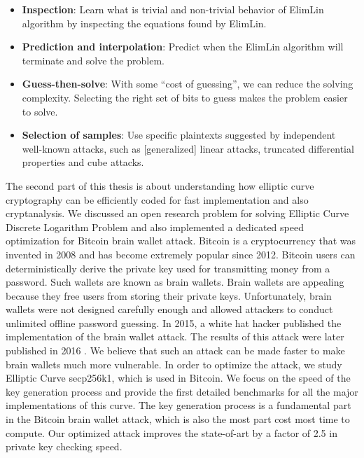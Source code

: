 \begin{itemize}
	\item \textbf{Inspection}: Learn what is trivial and non-trivial behavior of ElimLin algorithm by inspecting the equations found by ElimLin.
	\item \textbf{Prediction and interpolation}: Predict when the ElimLin algorithm will terminate and solve the problem.
	\item \textbf{Guess-then-solve}: With some ``cost of guessing'', we can reduce the solving complexity. Selecting the right set of bits to guess makes the problem easier to solve.
	\item \textbf{Selection of samples}: Use specific plaintexts suggested by independent well-known attacks,
	such as [generalized] linear attacks, truncated differential properties and cube attacks.
\end{itemize}

The second part of this thesis is about understanding how elliptic curve cryptography can be efficiently coded for fast implementation and also cryptanalysis. We discussed an open research problem for solving Elliptic Curve Discrete Logarithm Problem and also implemented a dedicated speed optimization for Bitcoin brain wallet attack. Bitcoin is a cryptocurrency that was invented in 2008 and has become extremely popular since 2012. Bitcoin users can deterministically derive the private key used for transmitting money from a password. Such wallets are known as brain wallets. Brain wallets are appealing because they free users from storing their private keys. Unfortunately, brain wallets were not designed carefully enough and allowed attackers to conduct unlimited offline password guessing. In 2015, a white hat hacker published the implementation of the brain wallet attack. The results of this attack were later published in 2016 \cite{vasek2016bitcoin}. We believe that such an attack can be made faster to make brain wallets much more vulnerable. In order to optimize the attack, we study Elliptic Curve secp256k1, which is used in Bitcoin. We focus on the speed of the key generation process and provide the first detailed benchmarks for all the major implementations of this curve. The key generation process is a fundamental part in the Bitcoin brain wallet attack, which is also the most part cost most time to compute. Our optimized attack improves the state-of-art by a factor of 2.5 in private key checking speed.

